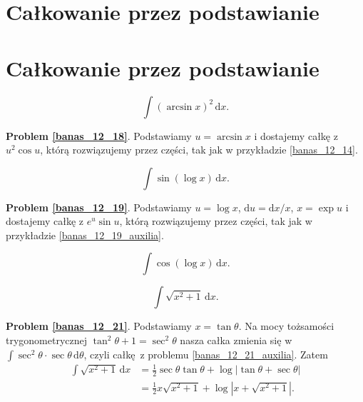\section{Całkowanie przez podstawianie}
\section{Całkowanie przez podstawianie}

\begin{problem_with_solution}
    \label{banas_12_18}%
    \begin{equation}
        \int (\arcsin x)^2 \,\mathrm{d}x.
    \end{equation}
\end{problem_with_solution}

\textbf{Problem \ref{banas_12_18}}.
Podstawiamy $u = \arcsin x$ i dostajemy całkę z $u^2 \cos u$, którą rozwiązujemy przez części, tak jak w przykładzie \ref{banas_12_14}.

\begin{problem_with_solution}
    \label{banas_12_19}%
    \begin{equation}
        \int \sin(\log x) \, \mathrm{d}x.
    \end{equation}
\end{problem_with_solution}

\textbf{Problem \ref{banas_12_19}}.
Podstawiamy $u = \log x$, $\mathrm{d} u = \mathrm{d} x / x$, $x = \exp u$ i dostajemy całkę z $e^u \sin u$, którą rozwiązujemy przez części, tak jak w przykładzie \ref{banas_12_19_auxilia}.

\begin{problem}
    \label{banas_12_20}%
    \begin{equation}
        \int \cos(\log x) \, \mathrm{d}x.
    \end{equation}
\end{problem}

\begin{problem_with_solution}
    \label{banas_12_21}%
    \begin{equation}
        \int \sqrt{x^2 + 1} \, \mathrm{d}x.
    \end{equation}
\end{problem_with_solution}

\textbf{Problem \ref{banas_12_21}}.
Podstawiamy $x = \tan \theta$.
Na mocy tożsamości trygonometrycznej $\tan^2 \theta + 1 = \sec^2 \theta$ nasza całka zmienia się w $\int \sec^2 \theta \cdot \sec \theta \,\mathrm{d}\theta$, czyli całkę z problemu \ref{banas_12_21_auxilia}.
Zatem
\begin{align}
    \int \sqrt{x^2 + 1} \, \mathrm{d}x & = \frac 12 \sec \theta \tan \theta + \log |\tan \theta + \sec \theta| \\
    & = \frac 1 2 x \sqrt{x^2 + 1} + \log \left|x + \sqrt{x^2+1}\right|.
\end{align}

